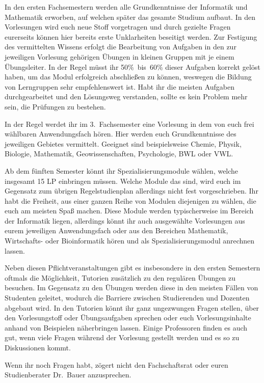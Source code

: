 In den ersten Fachsemestern werden alle Grundkenntnisse der Informatik und Mathematik erworben, auf welchen später das gesamte Studium aufbaut.
In den Vorlesungen wird euch neue Stoff vorgetragen und durch gezielte Fragen eurerseits können hier bereits erste Unklarheiten beseitigt werden.
Zur Festigung des vermittelten Wissens erfolgt die Bearbeitung von Aufgaben in den zur jeweiligen Vorlesung gehörigen Übungen in kleinen Gruppen mit je einem Übungsleiter.
In der Regel müsst ihr 50\%~bis~60\% dieser Aufgaben korrekt gelöst haben, um das Modul erfolgreich abschließen zu können, weswegen die Bildung von Lerngruppen sehr empfehlenswert ist.
Habt ihr die meisten Aufgaben durchgearbeitet und den Lösungsweg verstanden, sollte es kein Problem mehr sein, die Prüfungen zu bestehen.

In der Regel werdet ihr im 3.~Fachsemester eine Vorlesung in dem von euch frei wählbaren Anwendungsfach hören.
Hier werden euch Grundkenntnisse des jeweiligen Gebietes vermittelt.
Geeignet sind beispielsweise Chemie, Physik, Biologie, Mathematik, Geowissenschaften, Psychologie, BWL oder VWL.

Ab dem fünften Semester könnt ihr Spezialisierungsmodule wählen, welche insgesamt 15 LP einbringen müssen.
Welche Module das sind, wird euch im Gegensatz zum übrigen Regelstudienplan allerdings nicht fest vorgeschrieben.
Ihr habt die Freiheit, aus einer ganzen Reihe von Modulen diejenigen zu wählen, die euch am meisten Spaß machen.
Diese Module werden typischerweise im Bereich der Informatik liegen, allerdings könnt ihr auch ausgewählte Vorlesungen aus eurem jeweiligen Anwendungsfach oder aus den Bereichen Mathematik, Wirtschafts- oder Bioinformatik hören und als Spezialisierungsmodul anrechnen lassen.

Neben diesen Pflichtveranstaltungen gibt es insbesondere in den ersten Semestern oftmals die Möglichkeit, Tutorien zusätzlich zu den regulären Übungen zu besuchen.
Im Gegensatz zu den Übungen werden diese in den meisten Fällen von Studenten geleitet, wodurch die Barriere zwischen Studierenden und Dozenten abgebaut wird.
In den Tutorien könnt ihr ganz ungezwungen Fragen stellen, über den Vorlesungstoff oder Übungsaufgaben sprechen oder euch Vorlesungsinhalte anhand von Beispielen näherbringen lassen. Einige Professoren finden es auch gut, wenn viele Fragen während der Vorlesung gestellt werden und es so zu Diskussionen kommt.

Wenn ihr noch Fragen habt, zögert nicht den Fachschaftsrat oder euren Studienberater Dr.~Bauer anzusprechen.

